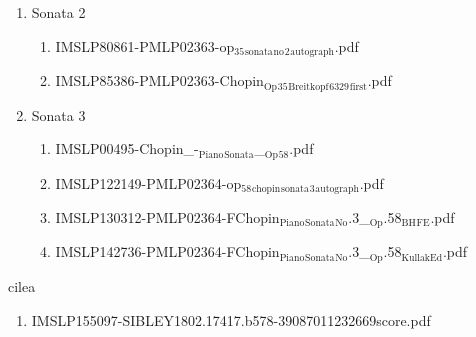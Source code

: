 \documentclass[11pt]{article}
\begin{document}
\begin{enumerate}
\begin{enumerate}
\item Sonata 2
\label{sec-1-1-1-1-44-21-8-2}
\begin{enumerate}
\item IMSLP80861-PMLP02363-op$_{\text{35}}$$_{\text{sonata}}$$_{\text{no}}$$_{\text{2}}$$_{\text{autograph}}$.pdf
\label{sec-1-1-1-1-44-21-8-2-1}

\item IMSLP85386-PMLP02363-Chopin$_{\text{Op}}$$_{\text{35}}$$_{\text{Breitkopf}}$$_{\text{6329}}$$_{\text{first}}$.pdf
\label{sec-1-1-1-1-44-21-8-2-2}
\end{enumerate}

\item Sonata 3
\label{sec-1-1-1-1-44-21-8-3}
\begin{enumerate}
\item IMSLP00495-Chopin\_-$_{\text{Piano}}$$_{\text{Sonata}}$\_$_{\text{Op}}$$_{\text{58}}$.pdf
\label{sec-1-1-1-1-44-21-8-3-1}

\item IMSLP122149-PMLP02364-op$_{\text{58}}$$_{\text{chopin}}$$_{\text{sonata}}$$_{\text{3}}$$_{\text{autograph}}$.pdf
\label{sec-1-1-1-1-44-21-8-3-2}

\item IMSLP130312-PMLP02364-FChopin$_{\text{Piano}}$$_{\text{Sonata}}$$_{\text{No}}$.3\_$_{\text{Op}}$.58$_{\text{BH}}$$_{\text{FE}}$.pdf
\label{sec-1-1-1-1-44-21-8-3-3}

\item IMSLP142736-PMLP02364-FChopin$_{\text{Piano}}$$_{\text{Sonata}}$$_{\text{No}}$.3\_$_{\text{Op}}$.58$_{\text{KullakEd}}$.pdf
\label{sec-1-1-1-1-44-21-8-3-4}
\end{enumerate}
\end{enumerate}
\end{enumerate}

\item cilea
\label{sec-1-1-1-1-44-22}
\begin{enumerate}
\item IMSLP155097-SIBLEY1802.17417.b578-39087011232669score.pdf
\label{sec-1-1-1-1-44-22-1}
\end{enumerate}
\end{document}
